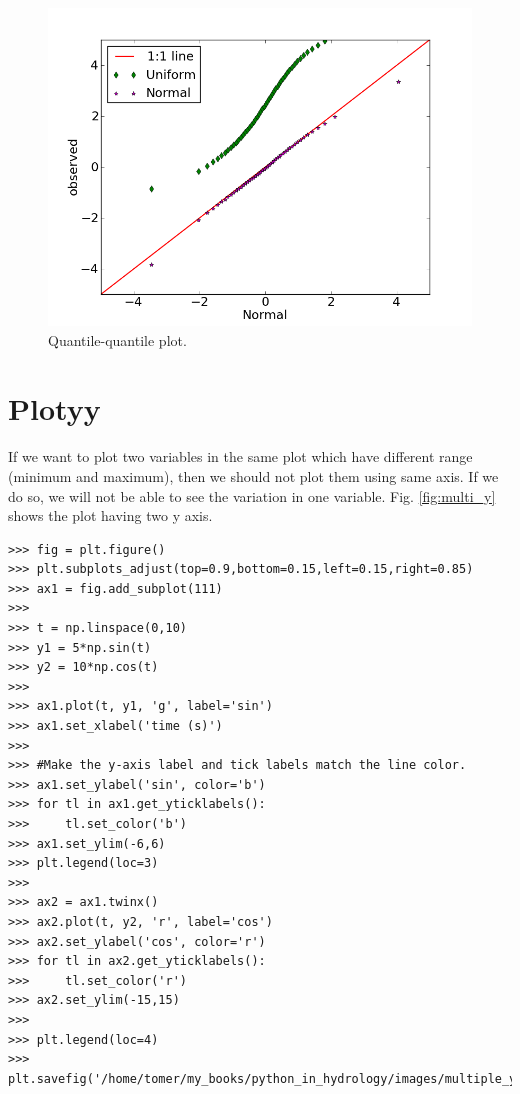 \documentclass[10pt]{book}
\begin{document}
\beforefig
\begin{figure}[h!]
  \centering
    \includegraphics[scale=0.5]{images/q_q.png}
  \caption{Quantile-quantile plot.}
   \label{fig:q_q}
\end{figure}
\afterfig

\section{Plotyy}
If we want to plot two variables in the same plot which have different range (minimum and maximum), then we should not plot them using same axis. If we do so, we will not be able to see the variation in one variable. Fig. \ref{fig:multi_y} shows the plot having two y axis. 
\beforeverb
\begin{verbatim}
>>> fig = plt.figure()
>>> plt.subplots_adjust(top=0.9,bottom=0.15,left=0.15,right=0.85)
>>> ax1 = fig.add_subplot(111)
>>> 
>>> t = np.linspace(0,10)
>>> y1 = 5*np.sin(t)
>>> y2 = 10*np.cos(t)
>>> 
>>> ax1.plot(t, y1, 'g', label='sin')
>>> ax1.set_xlabel('time (s)')
>>> 
>>> #Make the y-axis label and tick labels match the line color.
>>> ax1.set_ylabel('sin', color='b')
>>> for tl in ax1.get_yticklabels():
>>>     tl.set_color('b')
>>> ax1.set_ylim(-6,6)
>>> plt.legend(loc=3)
>>> 
>>> ax2 = ax1.twinx()
>>> ax2.plot(t, y2, 'r', label='cos')
>>> ax2.set_ylabel('cos', color='r')
>>> for tl in ax2.get_yticklabels():
>>>     tl.set_color('r')
>>> ax2.set_ylim(-15,15)    
>>> 
>>> plt.legend(loc=4)
>>> plt.savefig('/home/tomer/my_books/python_in_hydrology/images/multiple_y.png')
\end{verbatim}
\afterverb
\end{document}
